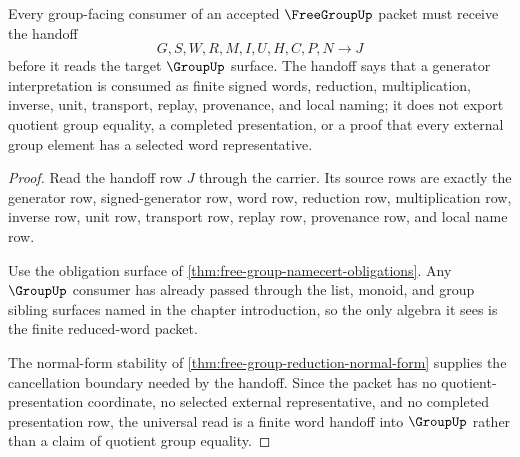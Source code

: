 \begin{theorem}
\label{thm:free-group-universal-word-handoff}
Every group-facing consumer of an accepted $\FreeGroupUp$ packet must receive the handoff
$$
G,S,W,R,M,I,U,H,C,P,N \longrightarrow J
$$
before it reads the target $\GroupUp$ surface. The handoff says that a generator interpretation is consumed as finite signed words, reduction, multiplication, inverse, unit, transport, replay, provenance, and local naming; it does not export quotient group equality, a completed presentation, or a proof that every external group element has a selected word representative.
\end{theorem}
\begin{proof}
Read the handoff row $J$ through the carrier. Its source rows are exactly the generator row, signed-generator row, word row, reduction row, multiplication row, inverse row, unit row, transport row, replay row, provenance row, and local name row.

Use the obligation surface of \autoref{thm:free-group-namecert-obligations}. Any $\GroupUp$ consumer has already passed through the list, monoid, and group sibling surfaces named in the chapter introduction, so the only algebra it sees is the finite reduced-word packet.

The normal-form stability of \autoref{thm:free-group-reduction-normal-form} supplies the cancellation boundary needed by the handoff. Since the packet has no quotient-presentation coordinate, no selected external representative, and no completed presentation row, the universal read is a finite word handoff into $\GroupUp$ rather than a claim of quotient group equality.
\end{proof}




